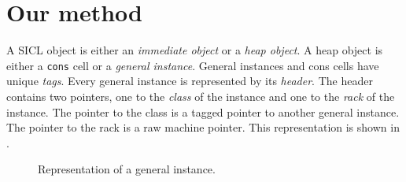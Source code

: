 \section{Our method}

A SICL object is either an \emph{immediate object} or a \emph{heap
  object}.  A heap object is either a \texttt{cons} cell or a
\emph{general instance}.  General instances and cons cells have unique
\emph{tags}.  Every general instance is represented by its
\emph{header}.  The header contains two pointers, one to the
\emph{class} of the instance and one to the \emph{rack} of the
instance.  The pointer to the class is a tagged pointer to another
general instance.  The pointer to the rack is a raw machine pointer.  
This representation is shown in .

\begin{figure}
\begin{center}
\end{center}
\caption{\label{fig-general-instance}
Representation of a general instance.}
\end{figure}
